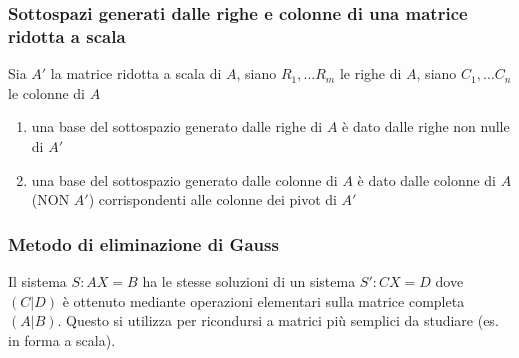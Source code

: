 \documentclass[a4paper]{article}
\begin{document}
\subsubsection*{Sottospazi generati dalle righe e colonne di una matrice ridotta a scala}
Sia \(A'\) la matrice ridotta a scala di \(A\), siano \(R_1, \dots R_m\) le righe di \(A\), siano \(C_1, \dots C_n\) le colonne di \(A\)
\begin{enumerate}
	\item una base del sottospazio generato dalle righe di \(A\) è dato dalle righe non nulle di \(A'\)
	\item una base del sottospazio generato dalle colonne di \(A\) è dato dalle colonne di \(A\) (NON \(A'\)) corrispondenti alle
	colonne dei pivot di \(A'\)
\end{enumerate}

\subsubsection*{Metodo di eliminazione di Gauss}
Il sistema \(S: AX = B\) ha le stesse soluzioni di un sistema \(S': CX = D\) dove \((C|D)\) è ottenuto mediante operazioni elementari
sulla matrice completa \((A|B)\). Questo si utilizza per ricondursi a matrici più semplici da studiare (es. in forma a scala).
\end{document}
